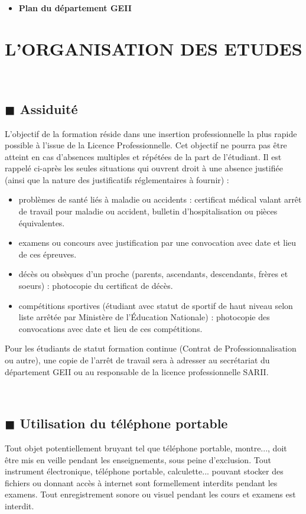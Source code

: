 \documentclass[11pt]{article}
\newcommand{\mysection}[1]
{
{
\setlength{\fboxsep}{0cm}
\noindent
\begin{minipage}{\linewidth}
\section{\large \textbf{#1}}
\vspace*{-10pt}
\end{minipage}\vspace*{10pt}
}
}
\newcommand{\mysubsection}[1]
{~\\
{\noindent
\begin{minipage}{\linewidth}
\subsection*{$\blacksquare$ #1}
\end{minipage}
}
}
\begin{document}
\begin{multicols}{2}
\noindent
\begin{itemize}
\item \textbf{Plan du département GEII}
\end{itemize}
\end{multicols}
\begin{figure}[!h]
\end{figure}

\newpage

\renewcommand{\labelitemi}{-}
\mysection{L'ORGANISATION DES ETUDES}
\vspace{-0.5cm}
\begin{multicols*}{2}
\raggedcolumns
\mysubsection{Assiduité}

L'objectif de la formation réside dans une insertion professionnelle la plus rapide possible à l'issue de la Licence Professionnelle. Cet objectif ne pourra pas être atteint en cas d'absences multiples et répétées de la part de l'étudiant. Il est rappelé ci-après les seules situations qui ouvrent droit à une absence justifiée (ainsi que la nature des justificatifs réglementaires à fournir) :
\begin{itemize}
\item problèmes de santé liés à maladie ou accidents : certificat médical valant arrêt de travail pour maladie ou accident, bulletin d'hospitalisation ou pièces équivalentes.
\item examens ou concours avec justification par une convocation avec date et lieu de ces épreuves.
\item décès ou obsèques d'un proche (parents, ascendants, descendants, frères et soeurs) : photocopie du certificat de décès.
\item compétitions sportives (étudiant avec statut de sportif de haut niveau selon liste arrêtée par Ministère de l'Éducation Nationale) : photocopie des convocations avec date et lieu de ces compétitions.
\end{itemize}

Pour les étudiants de statut formation continue (Contrat de Professionnalisation ou autre), une copie de l'arrêt de travail sera à adresser au secrétariat du département GEII ou au responsable de la licence professionnelle SARII.

\mysubsection{Utilisation du téléphone portable}
Tout objet potentiellement bruyant tel que téléphone portable, montre..., doit être mis en veille pendant les enseignements, sous peine d'exclusion. Tout instrument électronique, téléphone portable, calculette... pouvant  stocker des fichiers ou donnant accès à internet sont formellement interdits pendant les examens. Tout enregistrement sonore ou visuel pendant les cours et examens est interdit.


\end{multicols*}
\end{document}
